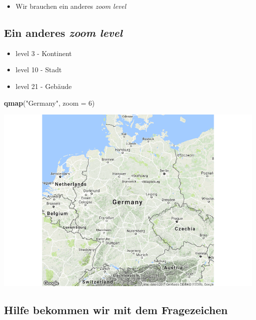 \documentclass[]{article}
\newenvironment{Shaded}{\begin{snugshade}}{\end{snugshade}}
\newcommand{\KeywordTok}[1]{\textcolor[rgb]{0.13,0.29,0.53}{\textbf{{#1}}}}
\newcommand{\DataTypeTok}[1]{\textcolor[rgb]{0.13,0.29,0.53}{{#1}}}
\newcommand{\DecValTok}[1]{\textcolor[rgb]{0.00,0.00,0.81}{{#1}}}
\newcommand{\StringTok}[1]{\textcolor[rgb]{0.31,0.60,0.02}{{#1}}}
\newcommand{\NormalTok}[1]{{#1}}
\providecommand{\tightlist}{%
  \setlength{\itemsep}{0pt}\setlength{\parskip}{0pt}}
\begin{document}
\begin{itemize}
\tightlist
\item
  Wir brauchen ein anderes \emph{zoom level}
\end{itemize}

\subsection{\texorpdfstring{Ein anderes \emph{zoom
level}}{Ein anderes zoom level}}\label{ein-anderes-zoom-level}

\begin{itemize}
\tightlist
\item
  level 3 - Kontinent
\item
  level 10 - Stadt
\item
  level 21 - Gebäude
\end{itemize}

\begin{Shaded}
\begin{Highlighting}[]
\KeywordTok{qmap}\NormalTok{(}\StringTok{"Germany"}\NormalTok{, }\DataTypeTok{zoom =} \DecValTok{6}\NormalTok{)}
\end{Highlighting}
\end{Shaded}

\includegraphics{Intro_Datenanalyse1_files/figure-latex/unnamed-chunk-241-1.pdf}

\subsection{Hilfe bekommen wir mit dem
Fragezeichen}\label{hilfe-bekommen-wir-mit-dem-fragezeichen}
\end{document}
